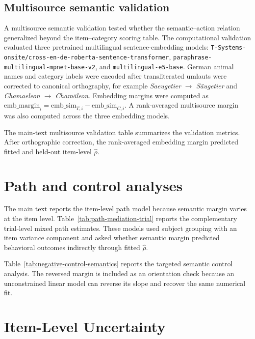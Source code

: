\documentclass[11pt,final]{article}
\begin{document}
\subsection{Multisource semantic validation}
\label{sec:supp-multisource}

A multisource semantic validation tested whether the semantic--action relation generalized beyond the item--category scoring table. The computational validation evaluated three pretrained multilingual sentence-embedding models: \texttt{T-Systems-onsite/cross-en-de-roberta-sentence-transformer}, \texttt{paraphrase-multilingual-mpnet-base-v2}, and \texttt{multilingual-e5-base}. German animal names and category labels were encoded after transliterated umlauts were corrected to canonical orthography, for example \textit{Saeugetier} $\rightarrow$ \textit{Säugetier} and \textit{Chamaeleon} $\rightarrow$ \textit{Chamäleon}. Embedding margins were computed as $\mathrm{emb\_margin}_i = \mathrm{emb\_sim}_{T,i} - \mathrm{emb\_sim}_{C,i}$. A rank-averaged multisource margin was also computed across the three embedding models.

The main-text multisource validation table summarizes the validation metrics. After orthographic correction, the rank-averaged embedding margin predicted fitted and held-out item-level $\hat{\rho}$.

\section{Path and control analyses}
\label{sec:supp-path-negative-controls}

The main text reports the item-level path model because semantic margin varies at the item level. Table~\ref{tab:path-mediation-trial} reports the complementary trial-level mixed path estimates. These models used subject grouping with an item variance component and asked whether semantic margin predicted behavioral outcomes indirectly through fitted $\hat{\rho}$.



Table~\ref{tab:negative-control-semantics} reports the targeted semantic control analysis. The reversed margin is included as an orientation check because an unconstrained linear model can reverse its slope and recover the same numerical fit.



\section{Item-Level Uncertainty}
\label{sec:supp-item-uncertainty}
\end{document}
